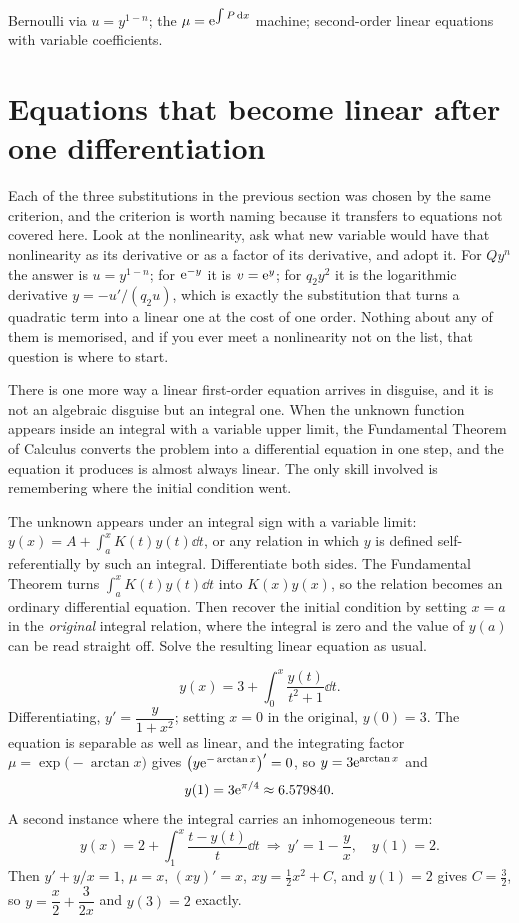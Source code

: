 \begin{seealsob}Bernoulli via $u=y^{1-n}$; the $\mu=\mathrm{e}^{\int P\,\mathrm{d} x}$ machine; second-order linear equations with variable coefficients.\end{seealsob}

\section{Equations that become linear after one differentiation}

Each of the three substitutions in the previous section was chosen by the same criterion, and the criterion is worth naming because it transfers to equations not covered here. Look at the nonlinearity, ask what new variable would have that nonlinearity as its derivative or as a factor of its derivative, and adopt it. For $Qy^{n}$ the answer is $u=y^{1-n}$; for $\mathrm{e}^{-y}$ it is $v=\mathrm{e}^{y}$; for $q_2y^{2}$ it is the logarithmic derivative $y=-u'/(q_2u)$, which is exactly the substitution that turns a quadratic term into a linear one at the cost of one order. Nothing about any of them is memorised, and if you ever meet a nonlinearity not on the list, that question is where to start.

There is one more way a linear first-order equation arrives in disguise, and it is not an algebraic disguise but an integral one. When the unknown function appears inside an integral with a variable upper limit, the Fundamental Theorem of Calculus converts the problem into a differential equation in one step, and the equation it produces is almost always linear. The only skill involved is remembering where the initial condition went.

\cue The unknown appears under an integral sign with a variable limit: $y(x)=A+\int_{a}^{x}K(t)y(t)\dd t$, or any relation in which $y$ is defined self-referentially by such an integral.
\method Differentiate both sides. The Fundamental Theorem turns $\int_a^{x}K(t)y(t)\dd t$ into $K(x)y(x)$, so the relation becomes an ordinary differential equation. Then recover the initial condition by setting $x=a$ in the \emph{original} integral relation, where the integral is zero and the value of $y(a)$ can be read straight off. Solve the resulting linear equation as usual.

\begin{worked}
\[y(x)=3+\int_0^{x}\frac{y(t)}{t^{2}+1}\dd t.\]
Differentiating, $y'=\dfrac{y}{1+x^{2}}$; setting $x=0$ in the original, $y(0)=3$. The equation is separable as well as linear, and the integrating factor $\mu=\exp\bigl(-\arctan x\bigr)$ gives $\bigl(y\mathrm{e}^{-\arctan x}\bigr)'=0$, so $y=3\mathrm{e}^{\arctan x}$ and
\[y(1)=3\mathrm{e}^{\pi/4}\approx6.579840.\]
A second instance where the integral carries an inhomogeneous term:
\[y(x)=2+\int_1^{x}\frac{t-y(t)}{t}\dd t\ \Longrightarrow\ y'=1-\frac{y}{x},\quad y(1)=2.\]
Then $y'+y/x=1$, $\mu=x$, $(xy)'=x$, $xy=\tfrac12x^{2}+C$, and $y(1)=2$ gives $C=\tfrac32$, so $y=\dfrac{x}{2}+\dfrac{3}{2x}$ and $y(3)=2$ exactly.
\end{worked}

